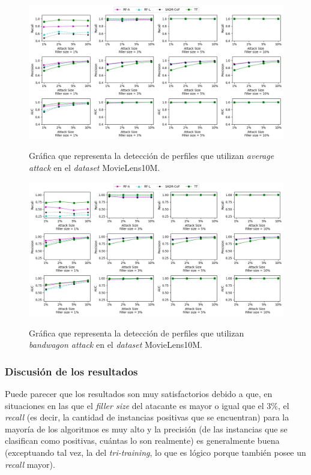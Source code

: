 \begin{figure}[h]
	\caption[\textit{Average attack}: detección.]{Gráfica que representa la detección de perfiles que utilizan \textit{average attack} en el \textit{dataset} MovieLens10M.}
	\centering
	\includegraphics[scale=0.45]{../img/memoria/5_resultados_average_attack}
	\label{5_average_attack}
\end{figure}

\begin{figure}[h]
	\caption[\textit{Bandwagon attack}: detección.]{Gráfica que representa la detección de perfiles que utilizan \textit{bandwagon attack} en el \textit{dataset} MovieLens10M.}
	\centering
	\includegraphics[scale=0.45]{../img/memoria/5_resultados_bandwagon_attack}
	\label{5_bandwagon_attack}
\end{figure}

\subsubsection{Discusión de los resultados}

Puede parecer que los resultados son muy satisfactorios debido a que, en situaciones en las que el \textit{filler size} del atacante es mayor o igual que el $3\%$, el \textit{recall} (es decir, la cantidad de instancias positivas que se encuentran) para la mayoría de los algoritmos es muy alto y la precisión (de las instancias que se clasifican como positivas, cuántas lo son realmente) es generalmente buena (exceptuando tal vez, la del \textit{tri-training}, lo que es lógico porque también posee un \textit{recall} mayor).


